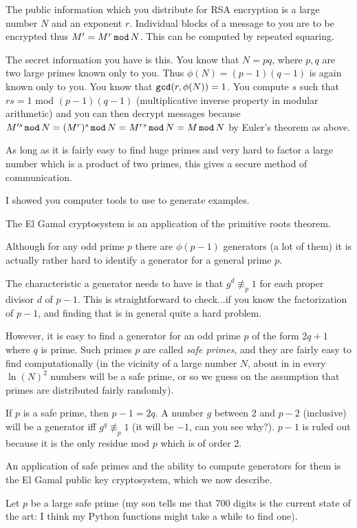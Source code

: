 \documentclass[12pt]{article}
\begin{document}
The public information which you distribute for RSA encryption is a large number $N$ and an exponent $r$.   Individual blocks of a message to you are to be encrypted thus $M'=M^r\,{\tt mod}\,N$.   This can be computed by repeated squaring.

The secret information you have is this.   You know that $N=pq$, where $p,q$ are two large primes known only to you.   Thus $\phi(N)=(p-1)(q-1)$ is again known only to you.  You know that ${\tt gcd}(r,\phi(N))=1$.
You compute $s$ such that $rs=1$ mod $(p-1)(q-1)$ (multiplicative inverse property in modular arithmetic) and you can then decrypt messages because $M'^s\,{\tt mod}\,N = (M^r)^s \,{\tt mod}\,N=M^{rs}\,{\tt mod}\,N= M\,{\tt mod}\,N$ by Euler's theorem as above.

As long as it is fairly easy to find huge primes and very hard to factor a large number which is a product of two primes, this gives a secure method of communication.

I showed you computer tools to use to generate examples.

The El Gamal cryptosystem is an application of the primitive roots theorem.

Although for any odd prime $p$ there are $\phi(p-1)$ generators (a lot of them) it is actually rather hard to identify a generator for a general prime $p$.

The characteristic a generator needs to have is that $g^d \not\equiv_p 1$ for each proper divisor $d$ of $p-1$.  This is straightforward to check...if you know the factorization of $p-1$, and finding that is in general quite a hard problem.

However, it is easy to find a generator for an odd prime $p$ of the form $2q+1$ where $q$ is prime.  Such primes $p$ are called {\em safe primes\/}, and they are fairly easy to find computationally (in the vicinity of a large number $N$, about in in every $\ln(N)^2$ numbers will be a safe prime, or so we guess on the assumption that primes are distributed fairly randomly).

If $p$ is a safe prime, then $p-1=2q$.  A number $g$  between 2 and $p-2$ (inclusive) will be a generator iff $g^q \not\equiv_p 1$ (it will be $-1$, can you see why?).  $p-1$ is ruled out because it is the only residue mod $p$ which is of order 2.

An application of safe primes and the ability to compute generators for them is the El Gamal public key cryptosystem, which we now describe.

Let $p$ be a large safe prime (my son tells me that 700 digits is the current state of the art:  I think my Python functions might take a while to find one).
\end{document}
